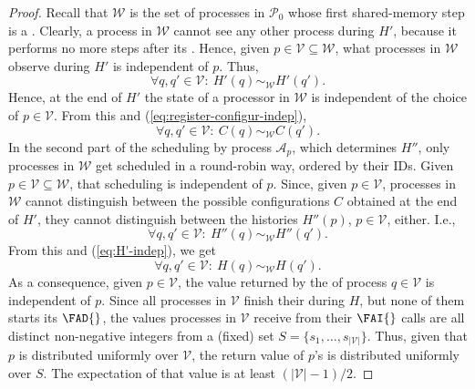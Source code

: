 \documentclass[11pt,letterpaper]{article}
\newcommand{\xwrite}{\text{\tt write}\xspace}
\renewcommand{\AA}{\mathcal{A}}
\newcommand{\PP}{\mathcal{P}}
\newcommand{\VV}{\mathcal{V}}
\newcommand{\WW}{\mathcal{W}}
\begin{document}
\begin{proof}
  Recall that $\WW$ is the set of processes in $\PP_0$ whose first shared-memory step is a \xwrite.
  Clearly, a process in $\WW$ cannot see any other process during $H'$, because it performs no more steps after its \xwrite.
  Hence, given $p\in\VV\subseteq\WW$, what processes in $\WW$ observe during $H'$ is independent of $p$.
  Thus,
  \begin{equation}\label{eq:H'-indep}
    \forall q,q'\in\VV:\ H'(q)\sim_{\WW}H'(q').
  \end{equation}
  Hence, at the end of $H'$ the state of a processor in $\WW$ is independent of the choice of $p\in\VV$.
  From this and (\ref{eq:register-configur-indep}),
  \begin{equation}\label{eq:configur-indep}
    \forall q,q'\in\VV:\ C(q)\sim_{\WW}C(q').
  \end{equation}
  In the second part of the scheduling by process $\AA_p$, which determines $H''$, only processes in $\WW$ get scheduled in a round-robin way, ordered by their IDs.
  Given $p\in\VV\subseteq\WW$, that scheduling is independent of $p$.
  Since, given $p\in\VV$, processes in $\WW$ cannot distinguish between the possible configurations $C$ obtained at the end of $H'$, they cannot distinguish between the histories $H''(p)$, $p\in\VV$, either.
  I.e.,
  \begin{displaymath}
    \forall q,q'\in\VV:\ H''(q)\sim_{\WW}H''(q').
  \end{displaymath}
  From this and (\ref{eq:H'-indep}), we get
  \begin{displaymath}
    \forall q,q'\in\VV:\ H(q)\sim_{\WW}H(q').
  \end{displaymath}
  As a consequence, given $p\in\VV$, the value returned by the \FAI{} of process $q\in\VV$ is independent of $p$.
  Since all processes in $\VV$ finish their \FAI{} during $H$, but none of them starts its $\FAD{}$, the values processes in $\VV$ receive from their $\FAI{}$ calls are all distinct non-negative integers from a (fixed) set $S=\{s_1,\dots,s_{|\VV|}\}$.
  Thus, given that $p$ is distributed uniformly over $\VV$, the return value of $p$'s \FAI{} is distributed uniformly over $S$.
  The expectation of that value is at least $(|\VV|-1)/2$.
\end{proof}
\end{document}
